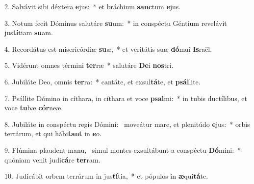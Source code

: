 2. Salvávit sibi déxtera \textbf{e}jus:~*  et bráchium \textbf{sanc}tum \textbf{e}jus.\

3. Notum fecit Dóminus salutáre \textbf{su}um:~*  in conspéctu Géntium revelávit jus\textbf{tí}tiam \textbf{su}am.\

4. Recordátus est misericórdiæ \textbf{su}æ,~*  et veritátis suæ \textbf{dó}mui \textbf{Is}raël.\

5. Vidérunt omnes términi \textbf{ter}ræ~*  salutáre \textbf{De}i \textbf{nos}tri.\

6. Jubiláte Deo, omnis \textbf{ter}ra:~*  cantáte, et exsul\textbf{tá}te, et \textbf{psál}lite.\

7. Psállite Dómino in cíthara, in cíthara et voce \textbf{psal}mi:~*  in tubis ductílibus, et voce \textbf{tu}bæ \textbf{cór}neæ.\

8. Jubiláte in conspéctu regis Dómini: \dag\  moveátur mare, et plenitúdo \textbf{e}jus:~*  orbis terrárum, et qui hábi\textbf{tant} in \textbf{e}o.\

9. Flúmina plaudent manu, \dag\  simul montes exsultábunt a conspéctu \textbf{Dó}mini:~*  quóniam venit judi\textbf{cá}re \textbf{ter}ram.\

10. Judicábit orbem terrárum in jus\textbf{tí}tia,~*  et pópulos in \textbf{æ}qui\textbf{tá}te.\

